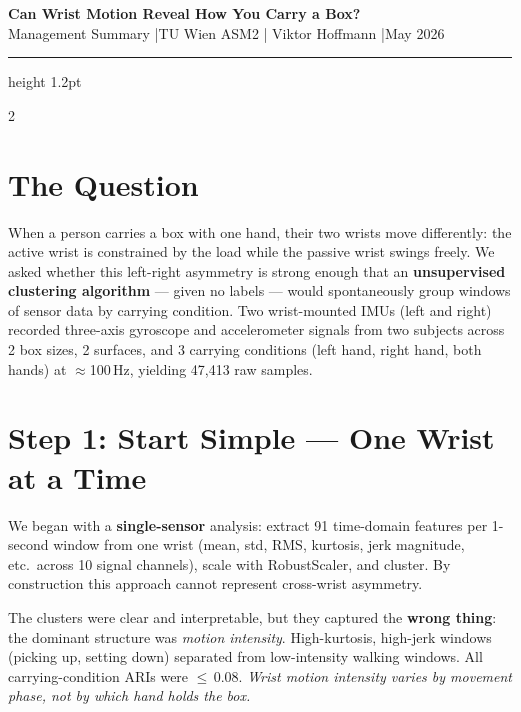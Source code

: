 \documentclass[10pt,a4paper]{article}
\begin{document}
\begin{center}
  {\large\bfseries\color{tuwblue}
    Can Wrist Motion Reveal How You Carry a Box?}\\[3pt]
  {\small\color{darkgray}
   Management Summary \quad|\quad TU Wien ASM2 \quad|\quad
   Viktor Hoffmann \quad|\quad May 2026}
\end{center}
\vspace{2pt}
\hrule height 1.2pt
\vspace{6pt}

\begin{multicols}{2}

\section{The Question}

When a person carries a box with one hand, their two wrists move differently:
the active wrist is constrained by the load while the passive wrist swings freely.
We asked whether this left-right asymmetry is strong enough that an
\textbf{unsupervised clustering algorithm} --- given no labels --- would spontaneously
group windows of sensor data by carrying condition.
Two wrist-mounted IMUs (left and right) recorded three-axis gyroscope and
accelerometer signals from two subjects across 2 box sizes, 2 surfaces, and
3 carrying conditions (left hand, right hand, both hands) at $\approx$100\,Hz,
yielding 47{,}413 raw samples.

\section{Step 1: Start Simple --- One Wrist at a Time}

We began with a \textbf{single-sensor} analysis: extract 91 time-domain features
per 1-second window from one wrist (mean, std, RMS, kurtosis, jerk magnitude,
etc.\ across 10 signal channels), scale with RobustScaler, and cluster.
By construction this approach cannot represent cross-wrist asymmetry.

The clusters were clear and interpretable, but they captured the \textbf{wrong
thing}: the dominant structure was \textit{motion intensity}.
High-kurtosis, high-jerk windows (picking up, setting down) separated from
low-intensity walking windows.
All carrying-condition ARIs were $\leq$\,0.08.
\textit{Wrist motion intensity varies by movement phase, not by which hand
holds the box.}


\end{multicols}
\end{document}

